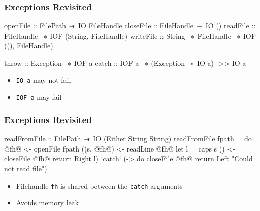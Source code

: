 \begin{frame}[fragile, c]
  \frametitle{Exceptions Revisited}
  \begin{center}
    \begin{haskell}
          openFile :: FilePath $\mathrel{-\mkern-6mu*}$ IO FileHandle
          closeFile :: FileHandle $\mathrel{-\mkern-6mu*}$ IO ()
          readFile :: FileHandle $\mathrel{-\mkern-6mu*}$ IOF (String, FileHandle)
          writeFile :: String $\mathrel{-\mkern-6mu*}$ FileHandle $\mathrel{-\mkern-6mu*}$ IOF ((), FileHandle)
          
          throw :: Exception $\mathrel{-\mkern-6mu*}$ IOF a
          catch :: IOF a $\mathrel{-\mkern-6mu*}$ (Exception $\mathrel{-\mkern-6mu*}$ IO a) ->> IO a
          \end{haskell}
     
     \begin{itemize}
     \item \texttt{IO a} may not fail
     \item \texttt{IOF a} may fail
     \end{itemize}
\end{center}
\end{frame}

\begin{frame}[fragile, c]
  \frametitle{Exceptions Revisited}
  \begin{center}
    \begin{haskell}
               readFromFile :: FilePath $\mathrel{-\mkern-6mu*}$ IO (Either String String)
               readFromFile fpath =
               do @fh@  <- openFile fpath
                  ((s, @fh@)  <- readLine @fh@
                  let l = caps s
                  () <- closeFile @fh@
                  return \dollar Right l) `catch`
                          (\e -> do closeFile @fh@
                          return \dollar Left "Could not read file")
                        \end{haskell}
                      \end{center}
     \begin{itemize}
     \item Filehandle \texttt{fh} is shared between the \texttt{catch} arguments
\item Avoids memory leak
\end{itemize}
\end{frame}


